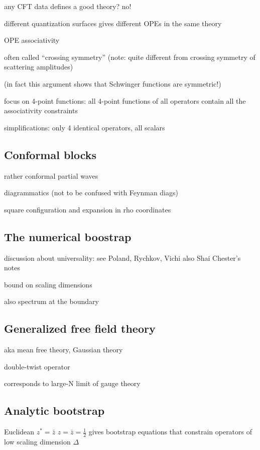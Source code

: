 \documentclass[a4paper,12pt]{article}
\numberwithin{equation}{section}
\begin{document}
any CFT data defines a good theory? no!

different quantization surfaces gives different OPEs in the same theory

OPE associativity

often called ``crossing symmetry'' (note: quite different from crossing symmetry of scattering amplitudes)

(in fact this argument shows that Schwinger functions are symmetric!)

focus on 4-point functions:
all 4-point functions of all operators contain all the associativity constraints


simplifications:
only 4 identical operators, all scalars


\subsection{Conformal blocks}

rather conformal partial waves

diagrammatics (not to be confused with Feynman diags)



square configuration and expansion in rho coordinates



\subsection{The numerical boostrap}

discussion about universality: see Poland, Rychkov, Vichi
also Shai Chester's notes



bound on scaling dimensions

also spectrum at the boundary


\subsection{Generalized free field theory}

aka mean free theory, Gaussian theory

double-twist operator

corresponds to large-N limit of gauge theory


\subsection{Analytic bootstrap}

Euclidean $z^* = \bar{z}$
$z = \bar{z} = \frac{1}{2}$ gives bootstrap equations that constrain operators of low scaling dimension $\Delta$
\end{document}
